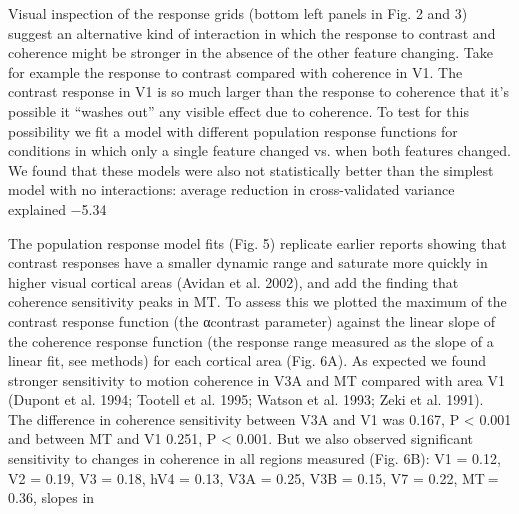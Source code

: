 \documentclass{report}
\begin{document}
Visual inspection of the response grids (bottom left panels in Fig. 2 and 3) suggest an alternative kind of interaction in which the response to contrast and coherence might be stronger in the absence of the other feature changing. Take for example the response to contrast compared with coherence in V1. The contrast response in V1 is so much larger than the response to coherence that it’s possible it “washes out” any visible effect due to coherence. To test for this possibility we fit a model with different population response functions for conditions in which only a single feature changed vs. when both features changed. We found that these models were also not statistically better than the simplest model with no interactions: average reduction in cross-validated variance explained −5.34%

The population response model fits (Fig. 5) replicate earlier reports showing that contrast responses have a smaller dynamic range and saturate more quickly in higher visual cortical areas (Avidan et al. 2002), and add the finding that coherence sensitivity peaks in MT. To assess this we plotted the maximum of the contrast response function (the αcontrast parameter) against the linear slope of the coherence response function (the response range measured as the slope of a linear fit, see methods) for each cortical area (Fig. 6A). As expected we found stronger sensitivity to motion coherence in V3A and MT compared with area V1 (Dupont et al. 1994; Tootell et al. 1995; Watson et al. 1993; Zeki et al. 1991). The difference in coherence sensitivity between V3A and V1 was 0.167, P < 0.001 and between MT and V1 0.251, P < 0.001. But we also observed significant sensitivity to changes in coherence in all regions measured (Fig. 6B): V1 = 0.12, V2 = 0.19, V3 = 0.18, hV4 = 0.13, V3A = 0.25, V3B = 0.15, V7 = 0.22, MT = 0.36, slopes in %
\end{document}
